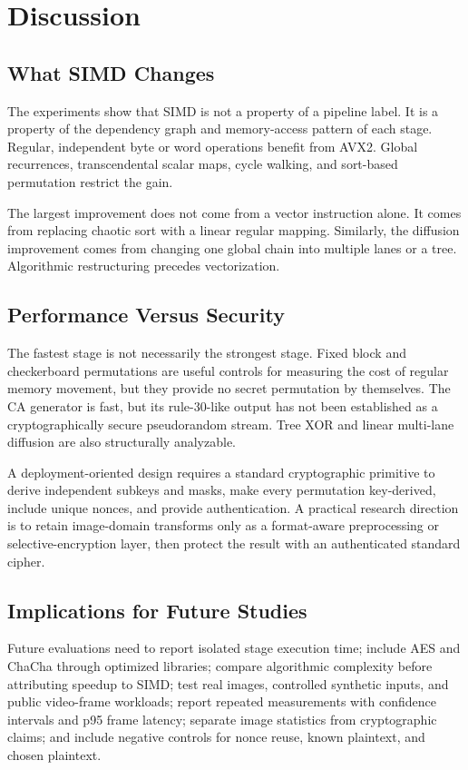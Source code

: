 \documentclass[twocolumn,runningheads]{svjour3}
\begin{document}
\section{Discussion}
\label{sec:discussion}

\subsection{What SIMD Changes}
The experiments show that SIMD is not a property of a pipeline label. It is a
property of the dependency graph and memory-access pattern of each stage.
Regular, independent byte or word operations benefit from AVX2. Global
recurrences, transcendental scalar maps, cycle walking, and sort-based
permutation restrict the gain.

The largest improvement does not come from a vector instruction alone. It
comes from replacing chaotic sort with a linear regular mapping. Similarly,
the diffusion improvement comes from changing one global chain into multiple
lanes or a tree. Algorithmic restructuring precedes vectorization.

\subsection{Performance Versus Security}
The fastest stage is not necessarily the strongest stage. Fixed block and
checkerboard permutations are useful controls for measuring the cost of
regular memory movement, but they provide no secret permutation by themselves.
The CA generator is fast, but its rule-30-like output has not been established
as a cryptographically secure pseudorandom stream. Tree XOR and linear
multi-lane diffusion are also structurally analyzable.

A deployment-oriented design requires a standard cryptographic primitive to
derive independent subkeys and masks, make every permutation key-derived,
include unique nonces, and provide authentication. A practical research
direction is to retain image-domain transforms only as a format-aware
preprocessing or selective-encryption layer, then protect the result with an
authenticated standard cipher.

\subsection{Implications for Future Studies}
Future evaluations need to report isolated stage execution time; include AES
and ChaCha through optimized libraries; compare algorithmic complexity before
attributing speedup to SIMD; test real images, controlled synthetic inputs,
and public video-frame workloads; report repeated measurements with confidence
intervals and p95 frame latency; separate image statistics from cryptographic
claims; and include negative controls for nonce reuse, known plaintext, and
chosen plaintext.
\end{document}
